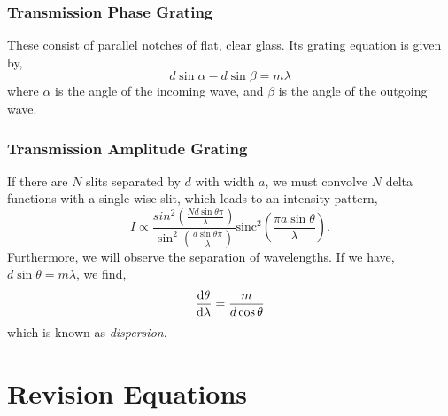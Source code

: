 \documentclass{book}
\begin{document}
{\subsection{Transmission Phase Grating}
These consist of parallel notches of flat, clear glass. Its grating equation is given by,
\begin{equation}
	d\sin\alpha - d\sin\beta = m\lambda
\end{equation}
where $\alpha$ is the angle of the incoming wave, and $\beta$ is the angle of the outgoing wave.
\subsection{Transmission Amplitude Grating}
If there are $N$ slits separated by $d$ with width $a$, we must convolve $N$ delta functions with a single wise slit, which leads to an intensity pattern,
\begin{equation}
	I \propto \frac{sin^2\left(\frac{Nd\sin\theta \pi}{\lambda}\right)}{\sin^2\left(\frac{d\sin\theta \pi}{\lambda}\right)}\text{sinc}^2\left(\frac{\pi a \sin\theta}{\lambda}\right).
\end{equation}
Furthermore, we will observe the separation of wavelengths. If we have, $d\sin\theta = m\lambda$, we find,
\begin{equation}
	\dv{\theta}{\lambda} = \frac{m}{d\cos\theta}
\end{equation}
which is known as \textit{dispersion}.
\appendix
\chapter{Revision Equations}
}
\end{document}
